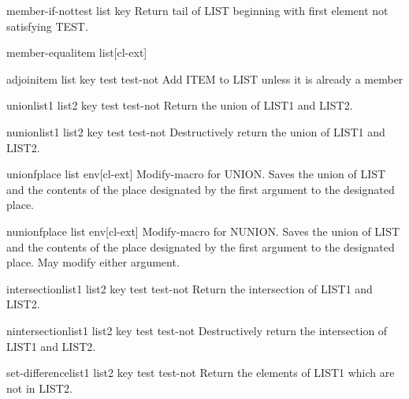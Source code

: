 \documentclass[10pt,english]{book}
\begin{document}
\begin{function}{member-if-not}{test list \key key}
  Return tail of LIST beginning with first element not satisfying TEST.
\end{function}

\begin{function}{member-equal}{item list}[cl-ext]
  
\end{function}

\begin{function}{adjoin}{item list \key key test test-not}
  Add ITEM to LIST unless it is already a member
\end{function}

\begin{function}{union}{list1 list2 \key key test test-not}
  Return the union of LIST1 and LIST2.
\end{function}

\begin{function}{nunion}{list1 list2 \key key test test-not}
  Destructively return the union of LIST1 and LIST2.
\end{function}

\begin{macro}{unionf}{place list \env env}[cl-ext]
  Modify-macro for UNION. Saves the union of LIST and the contents of the
place designated by the first argument to the designated place.
\end{macro}

\begin{macro}{nunionf}{place list \env env}[cl-ext]
  Modify-macro for NUNION. Saves the union of LIST and the contents of the
place designated by the first argument to the designated place. May modify
either argument.
\end{macro}

\begin{function}{intersection}{list1 list2 \key key test test-not}
  Return the intersection of LIST1 and LIST2.
\end{function}

\begin{function}{nintersection}{list1 list2 \key key test test-not}
  Destructively return the intersection of LIST1 and LIST2.
\end{function}

\begin{function}{set-difference}{list1 list2 \key key test test-not}
  Return the elements of LIST1 which are not in LIST2.
\end{function}
\end{document}
